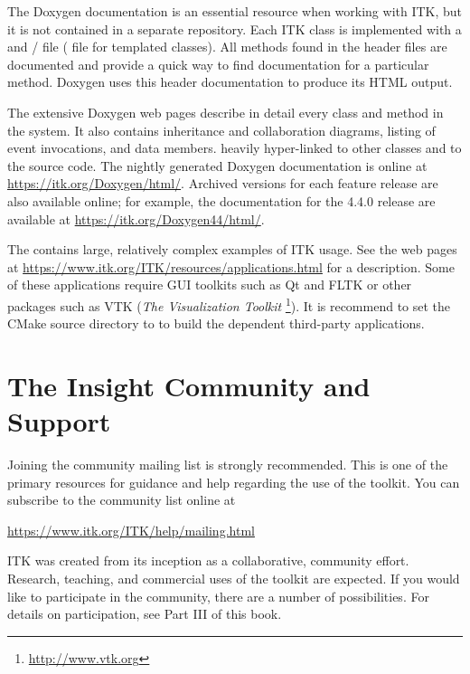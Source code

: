 The Doxygen documentation is an essential resource when working with ITK, but
it is not contained in a separate repository. Each ITK class is implemented
with a  and / file ( file for
templated classes). All methods found in the  header files are
documented and provide a quick way to find documentation for a particular
method.  Doxygen uses this header documentation to produce its HTML output.

The extensive Doxygen web pages describe in detail every class and method in
the system. It also contains inheritance and collaboration diagrams, listing
of event invocations, and data members.  heavily hyper-linked to other classes
and to the source code. The nightly generated Doxygen documentation is online at
\url{https://itk.org/Doxygen/html/}. Archived versions for each feature release
are also available online; for example, the documentation for the 4.4.0
release are available at \url{https://itk.org/Doxygen44/html/}.

The  contains large, relatively complex
examples of ITK usage. See the web pages at
\url{https://www.itk.org/ITK/resources/applications.html} for a description. Some of
these applications require GUI toolkits such as Qt and FLTK or other packages
such as VTK (\emph{The Visualization Toolkit}
\footnote{\url{http://www.vtk.org}}). It is recommend to set the CMake source directory
to  to build the dependent third-party applications.


\section{The Insight Community and Support}
\label{sec:AdditionalResources}
\label{sec:JoinMailList}


Joining the community mailing list is strongly recommended. This is one of the
primary resources for guidance and help regarding the use of the toolkit. You
can subscribe to the community list online at

\begin{center}
\url{https://www.itk.org/ITK/help/mailing.html}
\end{center}

ITK was created from its inception as a collaborative, community
effort. Research, teaching, and commercial uses of the toolkit are
expected. If you would like to participate in the community, there are a
number of possibilities. For details on participation, see Part III of this book.

